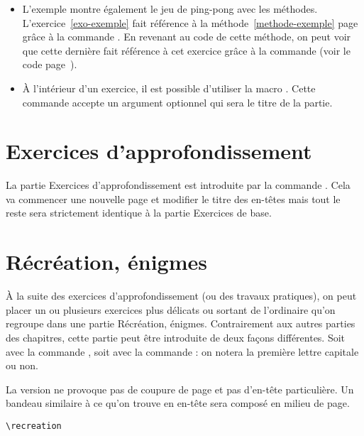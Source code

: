\documentclass[nocrop]{sesamanuel}
\begin{document}
\begin{remarque}
\begin{itemize}
 \item 
L'exemple montre également le jeu de ping-pong avec les
méthodes. L'exercice~\ref{exo-exemple} fait référence à la
méthode~\ref{methode-exemple} page~\pageref{methode-exemple} grâce à
la commande . En revenant au code de cette
méthode, on peut voir que cette dernière fait référence à cet exercice
grâce à la commande  (voir
le code page~\pageref{code-methode-exemple}).

\item À l'intérieur d'un exercice, il est possible d'utiliser la macro
. Cette commande accepte un argument optionnel qui sera le
titre de la partie.
\end{itemize}
\end{remarque}

\section{Exercices d'approfondissement}
\label{sec-exercices-d-approfondissement}
La partie Exercices d'approfondissement est introduite par la commande
. Cela va commencer une nouvelle page et modifier
le titre des en-têtes mais tout le reste sera strictement identique à
la partie Exercices de base.
\section{Récréation, énigmes}
\label{sec-recreation-enigmes}
À la suite des exercices d'approfondissement (ou des travaux
pratiques), on peut placer un ou plusieurs exercices plus délicats ou
sortant de l'ordinaire qu'on regroupe dans une partie Récréation,
énigmes. Contrairement aux autres parties des chapitres, cette partie
peut être introduite de deux façons différentes. Soit avec la commande
, soit avec la commande : on notera
la première lettre capitale ou non.

La version  ne provoque pas de coupure de page et pas
d'en-tête particulière. Un bandeau similaire à ce qu'on trouve en
en-tête sera composé en milieu de page. 
\begin{code}
\begin{verbatim}
\recreation
\end{verbatim}
\end{code}
\begin{result}
 
\end{result}
\end{document}
